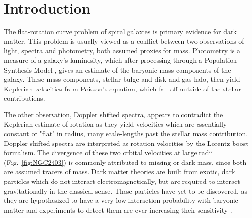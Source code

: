 \documentclass[reprint,%
 amsmath,amssymb,
 aps,
]{revtex4-1}
\begin{document}
\section{Introduction  \label{sec:uno}}



 The flat-rotation curve problem of spiral galaxies  is primary evidence for dark matter\cite{Rub,Bosma,1985ApJAlbada}. 
 This problem is usually viewed as a conflict between  two      observations of light, spectra and photometry, both  assumed  proxies for mass.
Photometry 
 is a measure of   a  galaxy's luminosity, which   after processing   through a Population Synthesis Model \cite{BelldYong,10.1093/mnras/sty3223}, gives an estimate of the  baryonic mass components of the galaxy. These mass components, stellar bulge and disk and gas halo, then     yield   Keplerian velocities 
   from Poisson's equation, which fall-off outside of the stellar contributions. 
   
   
 The other  observation,  Doppler shifted spectra, appears to contradict the Keplerian estimate of rotation as they yield velocities which are essentially constant or "flat" in radius, many scale-lengths past the stellar mass contribution. 
 Doppler shifted spectra are 
 interpreted as rotation velocities  by the   Lorentz boost formalism.
 The divergence of these two orbital velocities   at large radii   (Fig.~\ref{fig:NGC2403}) is commonly attributed  to  missing or dark mass, since both are assumed tracers of mass.  
Dark matter theories are built from   exotic,     dark particles  which do not interact electromagnetically, but are required to interact gravitationally in the classical sense. These particles have   yet to be    discovered, as they are hypothesized to have a very low interaction probability with baryonic matter and experiments to detect them are ever increasing their sensitivity \cite{Cebrian:2022brv}. 
\end{document}
